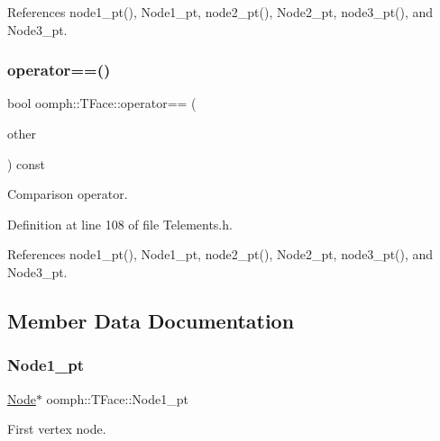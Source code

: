 References node1\+\_\+pt(), Node1\+\_\+pt, node2\+\_\+pt(), Node2\+\_\+pt, node3\+\_\+pt(), and Node3\+\_\+pt.

\mbox{\label{classoomph_1_1TFace_af7564b3292d27ca98a630564cf862b3a}} 
\subsubsection{\texorpdfstring{operator==()}{operator==()}}
{\footnotesize\ttfamily bool oomph\+::\+T\+Face\+::operator== (\begin{DoxyParamCaption}\item[{const \hyperlink{classoomph_1_1TFace}{T\+Face} \&}]{other }\end{DoxyParamCaption}) const\hspace{0.3cm}{\ttfamily [inline]}}



Comparison operator. 



Definition at line 108 of file Telements.\+h.



References node1\+\_\+pt(), Node1\+\_\+pt, node2\+\_\+pt(), Node2\+\_\+pt, node3\+\_\+pt(), and Node3\+\_\+pt.



\subsection{Member Data Documentation}
\mbox{\label{classoomph_1_1TFace_aa41911e6e35f06bf9f22b4fda74ca96c}} 
\subsubsection{\texorpdfstring{Node1\+\_\+pt}{Node1\_pt}}
{\footnotesize\ttfamily \hyperlink{classoomph_1_1Node}{Node}$\ast$ oomph\+::\+T\+Face\+::\+Node1\+\_\+pt\hspace{0.3cm}{\ttfamily [private]}}



First vertex node. 



